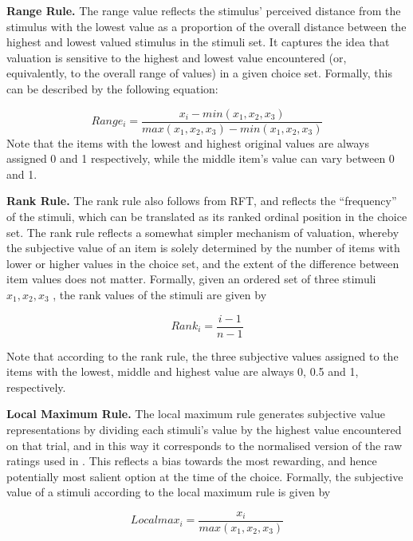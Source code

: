\documentclass[11pt,a4paper]{article}
\begin{document}
 \textbf{Range Rule.} The range value reflects the stimulus' perceived distance from the stimulus with the lowest value as a proportion of the overall distance between the highest and lowest valued stimulus in the stimuli set. It captures the idea that valuation is sensitive to the highest and lowest value encountered (or, equivalently, to the overall range of values) in a given choice set. Formally, this can be described by the following equation:
 
\begin{equation}
Range_{i}=\frac{x_i - min(x_1,x_2,x_3)}{max(x_1,x_2,x_3)-min(x_1,x_2,x_3)}
\label{eq:range}
\end{equation}
 Note that the items with the lowest and highest original values are always assigned 0 and 1 respectively, while the middle item's value can vary between 0 and 1.
 
 
 \textbf{Rank Rule.} The rank rule also follows from RFT, and reflects the “frequency” of the stimuli, which can be translated as its ranked ordinal position in the choice set. The rank rule reflects a somewhat simpler mechanism of valuation, whereby the subjective value of an item is solely determined by the number of items with lower or higher values in the choice set, and the extent of the difference between item values does not matter. Formally, given an ordered set of three stimuli $x_1, x_2, x_3$ , the rank values of the stimuli are given by
 
\begin{equation}
Rank_{i}=\frac{i-1}{n-1}
\label{eq:rank}
\end{equation}

Note that according to the rank rule, the three subjective values assigned to the items with the lowest, middle and highest value are always 0, 0.5 and 1, respectively.

\textbf{Local Maximum Rule.} The local maximum rule generates subjective value representations by dividing each stimuli's value by the highest value encountered on that trial, and in this way it corresponds to the normalised version of the raw ratings used in . This reflects a bias towards the most rewarding, and hence potentially most salient option at the time of the choice. Formally, the subjective value of a stimuli according to the local maximum rule is given by

\begin{equation}
Local max_{i}=\frac{x_i}{max(x_1,x_2,x_3)}
\label{eq:locmax}
\end{equation}
\end{document}
